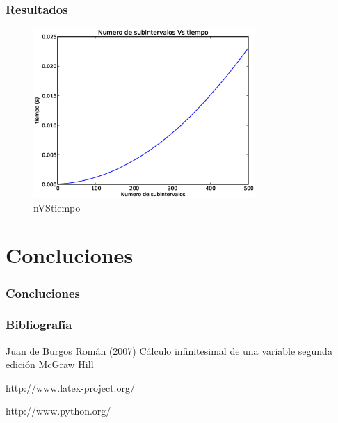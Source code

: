 \documentclass{beamer}
\begin{document}
\begin{frame}
  \frametitle{Resultados}
  \begin{figure}[!th]
    \begin{center}
      \includegraphics[width=0.75\textwidth]{img/Plot_nVStime.eps}
      \caption{nVStiempo}
      \label{fig:2}
    \end{center}
  \end{figure}
\end{frame}

\section{Concluciones}
\begin{frame}
 \frametitle{Concluciones}
\end{frame}



\begin{frame}
  \frametitle{Bibliografía}

  \begin{thebibliography}{10}

    \beamertemplatebookbibitems
    Juan de Burgos Román (2007) Cálculo infinitesimal de una variable segunda edición McGraw Hill
    
    \beamertemplatebookbibitems
    http://www.latex-project.org/
    
    \beamertemplatebookbibitems
    http://www.python.org/
    
      
    
      \end{thebibliography}
\end{frame}


\end{document}
